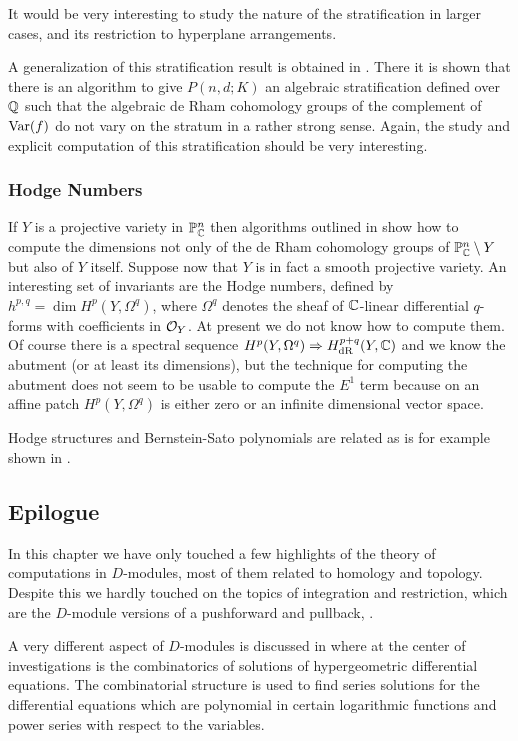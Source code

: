 It would be very interesting to study the nature of the stratification
in larger cases, and its restriction to hyperplane arrangements.

A generalization of this stratification result is obtained in
\cite{DM:W5}. There it is shown that there is an algorithm to give
$P(n,d;K)$ an algebraic
stratification defined over ${\mathbb Q}$ 
such that the algebraic de Rham cohomology groups of the
complement of $\operatorname{Var}(f)$ do not vary on the stratum in a rather strong
sense. 
Again, the study
and explicit computation of this stratification should be very
interesting.

\subsubsection{Hodge Numbers}
If $Y$ is a projective variety in ${\mathbb P}^n_{\mathbb C}$ then algorithms outlined in \cite{DM:W4}
show how to compute the dimensions not only of the de Rham cohomology
groups of ${\mathbb P}^n_{\mathbb C}\setminus Y$ but also of $Y$ itself. 
Suppose now that $Y$ is in fact a smooth  projective variety.  
An interesting set of invariants are the Hodge numbers, defined by
$h^{p,q}=\dim H^p(Y,\Omega^q)$, where $\Omega^q$ denotes the sheaf of
${\mathbb C}$-linear differential $q$-forms with coefficients in ${\mathcal O}_Y$. 
At present we do not know how to
compute them. Of course there is a spectral sequence $
H^p(Y,\Omega^q)\Rightarrow H^{p+q}_{{\rm dR}}(Y,{\mathbb C})$ and we know the abutment
(or at least its dimensions), but the technique for computing the
abutment does not seem to be usable 
to compute the $E^1$ term because on an affine
patch $H^p(Y,\Omega^q)$ is either zero or an infinite dimensional
vector space.

Hodge structures and Bernstein-Sato polynomials are related as is for
example shown in \cite{DM:Varchenko}. 

\subsection{Epilogue}
In this chapter we have only touched a few highlights of the theory of
computations in $D$-modules, most of them related to homology and
topology. Despite this we hardly touched on the topics of integration
and restriction, which are the $D$-module versions of a pushforward
and pullback, \cite{DM:K2,DM:Mebkhout,DM:O-T1,DM:W2}. 

A very different aspect of $D$-modules is discussed in
\cite{DM:SST} where at the center  of investigations is the combinatorics of
solutions of hypergeometric differential equations. The combinatorial
structure is used to find series solutions for the differential
equations which are polynomial in certain logarithmic functions and 
power series with respect to the variables.

